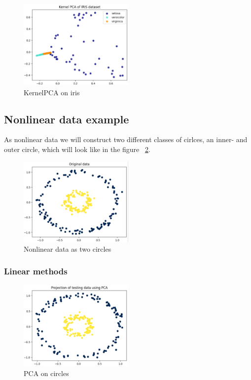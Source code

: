 \begin{figure}[htb!]
    \centering
    \includegraphics[width=0.5\textwidth]{figures/theory-example-figures/iris-kernelpca.png}
    \caption{KernelPCA on iris}
    \label{fig:iris-kernelpca}
    \end{figure}

\subsection{Nonlinear data example}\label{subsec:nonlinear-data-example}
As nonlinear data we will construct two different classes of cirlces, an inner- and outer circle, which will look like in the figure ~\ref{fig:circles}.

\begin{figure}[htb!]
    \centering
    \includegraphics[width=0.5\textwidth]{figures/theory-example-figures/fig-circles.png}
    \caption{Nonlinear data as two circles}
    \label{fig:circles}
    \end{figure}

\subsubsection{Linear methods}\label{subsubsec:linear-methods-on-circles}
\begin{figure}[htb!]
    \centering
    \includegraphics[width=0.5\textwidth]{figures/theory-example-figures/circles-pca.png}
    \caption{PCA on circles}
    \label{fig:circles-pca}
\end{figure}

